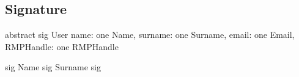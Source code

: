 \subsection{Signature}
abstract sig User {
    name: one Name,
    surname: one Surname,
    email: one Email,
    RMPHandle: one RMPHandle
}

sig Name{}
sig Surname{}
sig 